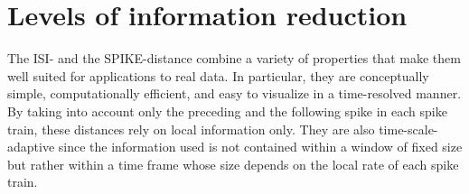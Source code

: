 \documentclass[10pt,twocolumn]{elsart5p}
\begin{document}
\section{\label{s:Information-reduction} Levels of information reduction}

The ISI- and the SPIKE-distance combine a variety of properties that make them well suited for applications to real data. In particular, they are conceptually simple, computationally efficient, and easy to visualize in a time-resolved manner. By taking into account only the preceding and the following spike in each spike train, these distances rely on local information only. They are also time-scale-adaptive since the information used is not contained within a window of fixed size but rather within a time frame whose size depends on the local rate of each spike train.
\end{document}
